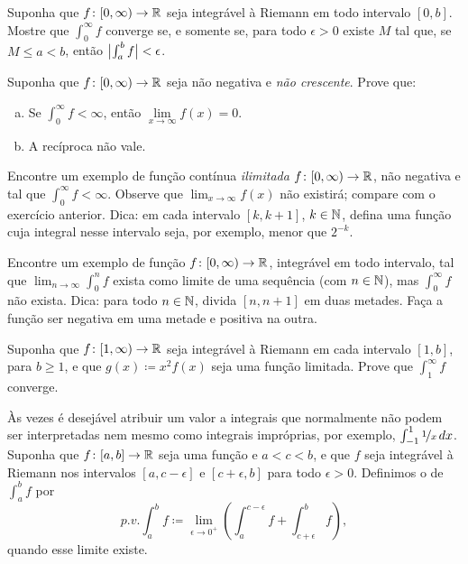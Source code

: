 \begin{exercise}
Suponha que $f \colon [0,\infty) \to {\mathbb{R}}$ seja integrável à Riemann em todo
intervalo $[0,b]$. Mostre que $\int_0^\infty f$ converge se, e somente se,
para todo $\epsilon>0$ existe $M$ tal que, se $M\leq a<b$, então
$\bigl\lvert {\int_a^b f} \bigr\rvert<\epsilon$.
\end{exercise}

\begin{exercise}
Suponha que $f \colon [0,\infty) \to {\mathbb{R}}$ seja não negativa e
\emph{não crescente}. Prove que:
\begin{enumerate}[a)]
\item
Se $\int_0^\infty f < \infty$, então $\lim\limits_{x\to\infty} f(x)=0$.
\item
A recíproca não vale.
\end{enumerate}
\end{exercise}

\begin{exercise}
Encontre um exemplo de função contínua \emph{ilimitada}
$f \colon [0,\infty) \to {\mathbb{R}}$, não negativa e tal que
$\int_0^\infty f < \infty$. Observe que $\lim_{x\to\infty} f(x)$ não
existirá; compare com o exercício anterior. Dica: em cada intervalo
$[k,k+1]$, $k\in{\mathbb{N}}$, defina uma função cuja integral nesse intervalo seja,
por exemplo, menor que $2^{-k}$.
\end{exercise}

\begin{exercise}
Encontre um exemplo de função $f \colon [0,\infty) \to {\mathbb{R}}$, integrável em
todo intervalo, tal que $\lim_{n\to\infty} \int_0^n f$ exista como limite
de uma sequência (com $n\in{\mathbb{N}}$), mas $\int_0^\infty f$ não exista.
Dica: para todo $n\in{\mathbb{N}}$, divida $[n,n+1]$ em duas metades. Faça a função
ser negativa em uma metade e positiva na outra.
\end{exercise}

\begin{exercise}
Suponha que $f \colon [1,\infty) \to {\mathbb{R}}$ seja integrável à Riemann em cada intervalo $[1,b]$, para $b\ge1$, e que
$g(x) \coloneqq x^2 f(x)$ seja uma função limitada. Prove que
$\int_1^\infty f$ converge.
\end{exercise}

\begin{exnote}
Às vezes é desejável atribuir um valor a integrais que normalmente não podem
ser interpretadas nem mesmo como integrais impróprias, por exemplo,
$\int_{-1}^1 \nicefrac{1}{x}\,dx$.
Suponha que $f \colon [a,b] \to {\mathbb{R}}$ seja uma função e $a<c<b$, e que $f$ seja
integrável à Riemann nos intervalos $[a,c-\epsilon]$ e $[c+\epsilon,b]$ para
todo $\epsilon>0$. Definimos o \emph{} de
$\int_a^b f$ por
\begin{equation*}
p.v.\!\int_a^b f \coloneqq \lim_{\epsilon\to 0^+}
\left(
\int_a^{c-\epsilon} f + 
\int_{c+\epsilon}^b f
\right) ,
\end{equation*}
quando esse limite existe.
\end{exnote}

